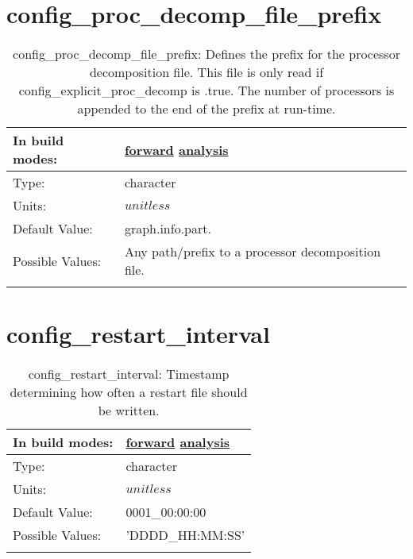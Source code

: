 \section[config\_proc\_decomp\_file\_prefix]{config\_proc\_decomp\_file\_prefix}
\label{sec:nm_sec_config_proc_decomp_file_prefix}
\begin{center}
\begin{longtable}{| p{2.0in} || p{4.0in} |}
    \hline
    In build modes: & \hyperref[subsec:forward_nm_tab_decomposition]{forward} \hyperref[subsec:analysis_nm_tab_decomposition]{analysis} \\
    \hline
    Type: & character \\
    \hline
    Units: & $unitless$ \\
    \hline
    Default Value: & graph.info.part. \\
    \hline
    Possible Values: & Any path/prefix to a processor decomposition file. \\
    \hline
    \caption{config\_proc\_decomp\_file\_prefix: Defines the prefix for the processor decomposition file. This file is only read if config\_explicit\_proc\_decomp is .true. The number of processors is appended to the end of the prefix at run-time.}
\end{longtable}
\end{center}
\section[config\_restart\_interval]{config\_restart\_interval}
\label{sec:nm_sec_config_restart_interval}
\begin{center}
\begin{longtable}{| p{2.0in} || p{4.0in} |}
    \hline
    In build modes: & \hyperref[subsec:forward_nm_tab_io]{forward} \hyperref[subsec:analysis_nm_tab_io]{analysis} \\
    \hline
    Type: & character \\
    \hline
    Units: & $unitless$ \\
    \hline
    Default Value: & 0001\_00:00:00 \\
    \hline
    Possible Values: & 'DDDD\_HH:MM:SS' \\
    \hline
    \caption{config\_restart\_interval: Timestamp determining how often a restart file should be written.}
\end{longtable}
\end{center}
